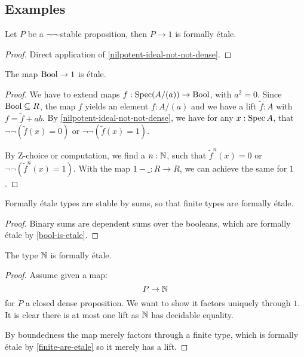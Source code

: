 \subsection{Examples}

\begin{proposition}%
  Let $P$ be a $\neg\neg$-stable proposition,
  then $P\to 1$ is formally étale.
\end{proposition}

\begin{proof}
  Direct application of \cref{nilpotent-ideal-not-not-dense}.
\end{proof}

\begin{proposition}\label{bool-is-etale}
  The map $\mathrm{Bool}\to 1$ is étale.
\end{proposition}

\begin{proof}
  We have to extend maps $f:\operatorname{Spec} (A/(a))\to \mathrm{Bool}$, with $a^2=0$.
  Since $\mathrm{Bool}\subseteq R$, the map $f$ yields an element $f:A/(a)$
  and we have a lift $\tilde{f}:A$ with $f=\tilde{f}+ab$.
  By \cref{nilpotent-ideal-not-not-dense},
  we have for any $x:\operatorname{Spec} A$, that $\neg\neg(\tilde{f}(x)=0)$ or $\neg\neg(\tilde{f}(x)=1)$.

  By Z-choice or computation, we find a $n:\mathbb{N}$,
  such that $\tilde{f}^n(x)=0$ or $\neg\neg(\tilde{f}^n(x)=1)$.
  With the map $1-\_:R\to R$, we can achieve the same for $1$.
\end{proof}

\begin{proposition}\label{finite-are-etale}
Formally étale types are stable by sums, so that finite types are formally étale.
\end{proposition}

\begin{proof}
Binary sums are dependent sums over the booleans, which are formally étale by \cref{bool-is-etale}.
\end{proof}

\begin{proposition}
The type $\mathbb{N}$ is formally étale.
\end{proposition}

\begin{proof}
Assume given a map:
\[P\to \mathbb{N}\]
for $P$ a closed dense proposition. We want to show it factors uniquely through $1$. It is clear there is at most one lift as $\mathbb{N}$ has decidable equality.

By boundedness the map merely factors through a finite type, which is formally étale by \cref{finite-are-etale} so it merely has a lift.
\end{proof}

